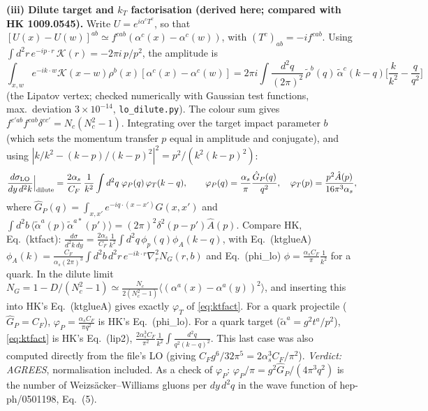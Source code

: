 \medskip\noindent\textbf{(iii) Dilute target and $k_T$ factorisation (derived here; compared with HK 1009.0545).} Write $U=e^{i\alpha^cT^c}$, so that $[U(x)-U(w)]^{ab}\simeq f^{cab}(\alpha^c(x)-\alpha^c(w))$, with $(T^c)_{ab}=-if^{cab}$. Using $\int d^2r\,e^{-ip\cdot r}\,\mathcal K(r)=-2\pi i\,p/p^2$, the amplitude is
\[
\int_{x,w}e^{-ik\cdot w}\mathcal K(x-w)\rho^b(x)[\alpha^c(x)-\alpha^c(w)]
=2\pi i\int\!\frac{d^2q}{(2\pi)^2}\,\tilde\rho^b(q)\,\tilde\alpha^c(k-q)\Big[\frac{k}{k^2}-\frac{q}{q^2}\Big]
\]
(the Lipatov vertex; checked numerically with Gaussian test functions, max.\ deviation $3\times10^{-14}$, \texttt{lo\_dilute.py}). The colour sum gives $f^{c'ab}f^{cab}\delta^{cc'}=N_c(N_c^2-1)$. Integrating over the target impact parameter $b$ (which sets the momentum transfer $p$ equal in amplitude and conjugate), and using $|k/k^2-(k-p)/(k-p)^2|^2=p^2/(k^2(k-p)^2)$:
\begin{equation}
\frac{d\sigma_{\rm LO}}{dy\,d^2k}\Big|_{\rm dilute}=\frac{2\alpha_s}{C_F}\,\frac{1}{k^2}\int d^2q\;\varphi_P(q)\,\varphi_T(k-q),\qquad
\varphi_P(q)=\frac{\alpha_s}{\pi}\frac{\hat G_P(q)}{q^2},\quad \varphi_T(p)=\frac{p^2\hat A(p)}{16\pi^3\alpha_s},
\label{eq:ktfact}
\end{equation}
where $\hat G_P(q)=\int_{x,x'}e^{-iq\cdot(x-x')}G(x,x')$ and $\int d^2b\,\langle\tilde\alpha^a(p)\tilde\alpha^{a*}(p')\rangle=(2\pi)^2\delta^2(p-p')\hat A(p)$.
Compare HK, Eq.~(ktfact): $\frac{d\sigma}{d^2k\,dy}=\frac{2\alpha_s}{C_F}\frac{1}{k^2}\int d^2q\,\phi_p(q)\phi_A(k-q)$, with Eq.~(ktglueA) $\phi_A(k)=\frac{C_F}{\alpha_s(2\pi)^3}\int d^2b\,d^2r\,e^{-ik\cdot r}\nabla_r^2N_G(r,b)$ and Eq.~(phi\_lo) $\phi=\frac{\alpha_sC_F}{\pi}\frac{1}{k^2}$ for a quark.
In the dilute limit $N_G=1-D/(N_c^2-1)\simeq\frac{N_c}{2(N_c^2-1)}\langle(\alpha^a(x)-\alpha^a(y))^2\rangle$, and inserting this into HK's Eq.~(ktglueA) gives exactly $\varphi_T$ of \eqref{eq:ktfact}. For a quark projectile ($\hat G_P=C_F$), $\varphi_P=\frac{\alpha_sC_F}{\pi q^2}$ is HK's Eq.~(phi\_lo). For a quark target ($\tilde\alpha^a=g^2t^a/p^2$), \eqref{eq:ktfact} is HK's Eq.~(lip2), $\frac{2\alpha_s^3C_F}{\pi^2}\frac{1}{k^2}\int\frac{d^2q}{q^2(k-q)^2}$. This last case was also computed directly from the file's LO (giving $C_Fg^6/32\pi^5=2\alpha_s^3C_F/\pi^2$). \emph{Verdict: AGREES}, normalisation included. As a check of $\varphi_P$: $\varphi_P/\pi=g^2\hat G_P/(4\pi^3q^2)$ is the number of Weizs\"acker--Williams gluons per $dy\,d^2q$ in the wave function of hep-ph/0501198, Eq.~(5).

